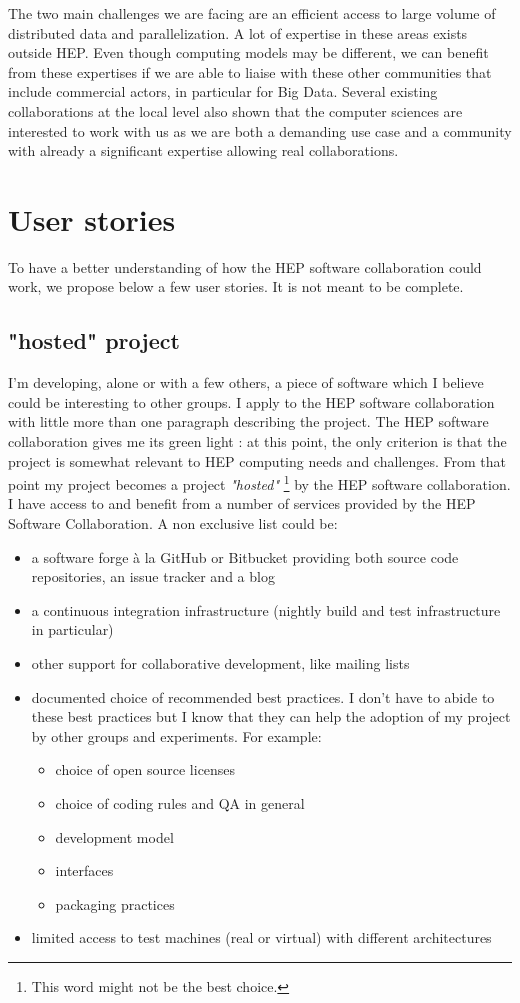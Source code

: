\documentclass[11pt]{article} %
\begin{document}
The two main challenges we are facing are an efficient access to large
volume of distributed data and parallelization. A lot of expertise in
these areas exists outside HEP. Even though computing models may be
different, we can benefit from these expertises if we are able to
liaise with these other communities that include commercial actors,
in particular for Big Data. Several existing collaborations at the
local level also shown that the computer sciences are interested to
work with us as we are both a demanding use case and a community with
already a significant expertise allowing real collaborations.


\section{User stories}
To have a better understanding of how the HEP software collaboration could work, we propose below a few user stories. It is not meant to be complete.

\subsection{"hosted" project }
I'm developing, alone or with a few others, a piece of software which I believe could be interesting to other groups. I apply to the HEP software collaboration 
with little more than one paragraph describing the project. The HEP software collaboration gives me its green light : at this point, the only criterion is that 
the project is somewhat relevant to HEP computing needs and challenges. From that point my project becomes a project {\em "hosted"} \footnote{This word might not be the best choice.} 
by the HEP software collaboration. I have access to and benefit from a number of services provided by the HEP Software Collaboration. A non exclusive list could be:
\begin{itemize}
\item a software forge à la GitHub or Bitbucket providing both source code repositories, an issue tracker and a blog
\item a continuous integration infrastructure (nightly build and test infrastructure in particular)
\item other support for collaborative development, like mailing lists
\item documented choice of recommended best practices. I don't have to abide to these best practices but I know that they can help the adoption of my project by other groups and experiments. For example:
\begin{itemize}
\item choice of open source licenses
\item choice of coding rules and QA in general
\item development model
\item interfaces
\item packaging practices
\end{itemize}

\item limited access to test machines (real or virtual) with different architectures
\end{itemize}
\end{document}
